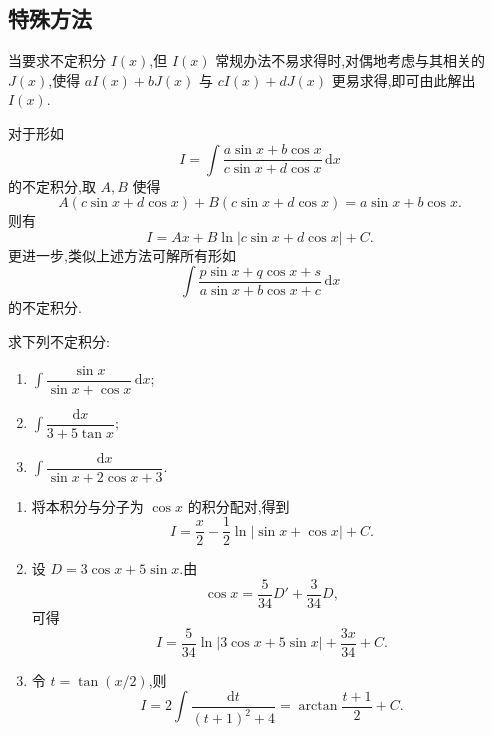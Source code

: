 \subsection{特殊方法}



当要求不定积分 $I(x)$,但 $I(x)$ 常规办法不易求得时,对偶地考虑与其相关的 $J(x)$,使得 $aI(x)+bJ(x)$ 与 $cI(x)+dJ(x)$ 更易求得,即可由此解出 $I(x)$.

\begin{proposition}[\markstar]
    对于形如
    \[
        I=\int\dfrac{a\sin x+b\cos x}{c\sin x+d\cos x}\,\mathrm{d}x
    \]
    的不定积分,取 $A,B$ 使得
    \[
        A(c\sin x+d\cos x)+B(c\sin x+d\cos x)
        =a\sin x+b\cos x.
    \]
    则有
    \[
        I=Ax+B\ln|c\sin x+d\cos x|+C.
    \]
    更进一步,类似上述方法可解所有形如
    \[
        \int\dfrac{p\sin x+q\cos x+s}{a\sin x+b\cos x+c}\,\mathrm{d}x
    \]
    的不定积分.
\end{proposition}

\begin{example}
    求下列不定积分:
    \begin{enumerate}
        \item $\displaystyle\int\dfrac{\sin x}{\sin x+\cos x}\,\mathrm{d}x$;
        \item $\displaystyle\int\dfrac{\mathrm{d}x}{3+5\tan x}$;
        \item $\displaystyle\int\dfrac{\mathrm{d}x}{\sin x+2\cos x+3}$.
    \end{enumerate}
\end{example}
\exampleblank

\begin{solution}
    \begin{enumerate}
        \item 将本积分与分子为 $\cos x$ 的积分配对,得到
              \[
                  I=\dfrac{x}{2}-\dfrac{1}{2}\ln|\sin x+\cos x|+C.
              \]
        \item 设 $D=3\cos x+5\sin x$.由
              \[
                  \cos x=\dfrac{5}{34}D'+\dfrac{3}{34}D,
              \]
              可得
              \[
                  I=\dfrac{5}{34}\ln|3\cos x+5\sin x|+\dfrac{3x}{34}+C.
              \]
        \item 令 $t=\tan(x/2)$,则
              \[
                  I=2\int\dfrac{\mathrm{d}t}{(t+1)^2+4}
                  =\arctan\dfrac{t+1}{2}+C.
              \]
    \end{enumerate}
\end{solution}

